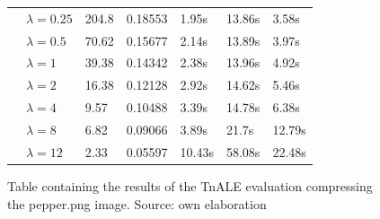 \documentclass[11pt,a4paper,openright,oneside]{book}
\numberwithin{equation}{section}
\begin{document}
{\begin{figure}[h]
\begin{adjustwidth}{-30pt}{-30pt}
\begin{tabular}{lllllll}
                     & $\lambda = 0.25$ & 204.8  & 0.18553    & 1.95s  & 13.86s            & 3.58s              \\
                     & $\lambda = 0.5$  & 70.62  & 0.15677    & 2.14s  & 13.89s            & 3.97s              \\
                     & $\lambda = 1$    & 39.38  & 0.14342    & 2.38s  & 13.96s            & 4.92s              \\
                     & $\lambda = 2$    & 16.38  & 0.12128    & 2.92s  & 14.62s            & 5.46s              \\
                     & $\lambda = 4$    & 9.57   & 0.10488    & 3.39s  & 14.78s            & 6.38s              \\
                     & $\lambda = 8$    & 6.82   & 0.09066    & 3.89s  & 21.7s             & 12.79s             \\
                     & $\lambda = 12$   & 2.33   & 0.05597    & 10.43s & 58.08s            & 22.48s            
\end{tabular}

\end{adjustwidth}

\caption{Table containing the results of the TnALE evaluation compressing the pepper.png image. Source: own elaboration}
\label{fig:ap-lots-of-numbers}
\end{figure}

\begin{figure}[h]

\begin{adjustwidth}{-3cm}{-3cm}


\end{adjustwidth}
\end{figure}}
\end{document}
